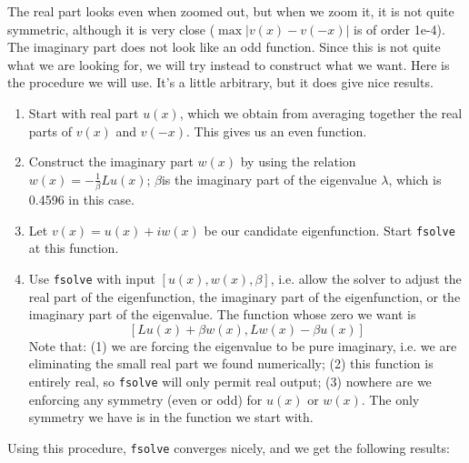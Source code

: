 \documentclass[12pt]{article}
\begin{document}
The real part looks even when zoomed out, but when we zoom it, it is not quite symmetric, although it is very close ($\max |v(x) - v(-x)|$ is of order 1e-4). The imaginary part does not look like an odd function. Since this is not quite what we are looking for, we will try instead to construct what we want. Here is the procedure we will use. It's a little arbitrary, but it does give nice results.
\begin{enumerate}
	\item Start with real part $u(x)$, which we obtain from averaging together the real parts of $v(x)$ and $v(-x)$. This gives us an even function.
	\item Construct the imaginary part $w(x)$ by using the relation $w(x) = -\frac{1}{\beta}Lu(x)$; $\beta$is the imaginary part of the eigenvalue $\lambda$, which is 0.4596 in this case.
	\item Let $v(x) = u(x) + i w(x)$ be our candidate eigenfunction. Start \texttt{fsolve} at this function.
	\item Use \texttt{fsolve} with input $[u(x), w(x), \beta]$, i.e. allow the solver to adjust the real part of the eigenfunction, the imaginary part of the eigenfunction, or the imaginary part of the eigenvalue. The function whose zero we want is
	\[
	[ L u(x) + \beta w(x), L w(x) - \beta u(x) ]
	\]
	Note that: (1) we are forcing the eigenvalue to be pure imaginary, i.e. we are eliminating the small real part we found numerically; (2) this function is entirely real, so \texttt{fsolve} will only permit real output; (3) nowhere are we enforcing any symmetry (even or odd) for $u(x)$ or $w(x)$. The only symmetry we have is in the function we start with.
\end{enumerate}
Using this procedure, \texttt{fsolve} converges nicely, and we get the following results:
\end{document}
